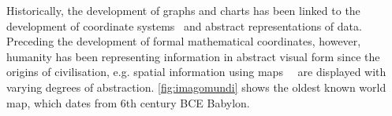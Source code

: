 \documentclass[letterpaper]{ar-1col}\usepackage[]{graphicx}\usepackage[]{color}
\newcommand{\svp}[1]{\textcolor{blue}{#1}}
\begin{document}

Historically, the development of graphs and charts has been linked to the development of coordinate systems~\citep{fienbergGraphicalMethodsStatistics1979,benigerQuantitativeGraphicsStatistics1978,funkhouserHistoricalDevelopmentGraphical1937} and abstract representations of data. Preceding the development of formal mathematical coordinates, however, humanity has been representing information in abstract visual form since the origins of civilisation, e.g. spatial information using maps~~\citep{smithImagoMundiLogo1996} are displayed with varying degrees of abstraction. \autoref{fig:imagomundi} shows the oldest known world map, which dates from 6th century BCE Babylon. %
\end{document}
